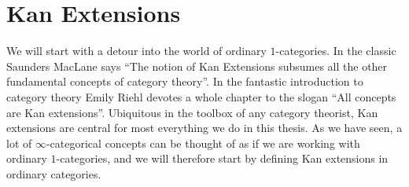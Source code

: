 \documentclass[../../thesis.tex]{subfiles}
\begin{document}
\section{Kan Extensions}
We will start with a detour into the world of ordinary $1$-categories.
In the  classic \cite{MacLane} Saunders MacLane says ``The notion of Kan Extensions subsumes all the other fundamental concepts of category theory''.
In the fantastic introduction to category theory \cite{CatContext} Emily Riehl devotes a whole chapter to the slogan ``All concepts are Kan extensions''.
Ubiquitous in the toolbox of any category theorist, Kan extensions are central for most everything we do in this thesis.
As we have seen, a lot of $\infty$-categorical concepts can be thought of as if we are working with ordinary $1$-categories, and we will therefore start by defining Kan extensions in ordinary categories.
\end{document}
